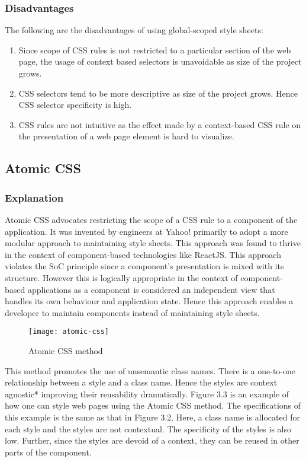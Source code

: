 \documentclass[12pt]{article}
\begin{document}
\subsubsection{Disadvantages}
The following are the disadvantages of using global-scoped style sheets:
\begin{enumerate}
	\item Since scope of CSS rules is not restricted to a particular section of the web page, the usage of context based selectors is unavoidable as size of the project grows.

	\item CSS selectors tend to be more descriptive as size of the project grows. Hence CSS selector specificity is high.

	\item CSS rules are not intuitive as the effect made by a context-based CSS rule on the presentation of a web page element is hard to visualize.
\end{enumerate}

\subsection{Atomic CSS}
\subsubsection{Explanation}
Atomic CSS advocates restricting the scope of a CSS rule to a component of the application. It was invented by engineers at Yahoo! primarily to adopt a more modular approach to maintaining style sheets. This approach was found to thrive in the context of component-based technologies like ReactJS. This approach violates the SoC principle since a component's presentation is mixed with its structure. However this is logically appropriate in the context of component-based applications as a component is considered an independent view that handles its own behaviour and application state. Hence this approach enables a developer to maintain components instead of maintaining style sheets.

\vspace{0.5cm}

\begin{figure}[h]
\texttt{[image: atomic-css]}
\centering
\caption{Atomic CSS method}
\end{figure}

\vspace{0.5cm}

This method promotes the use of unsemantic class names. There is a one-to-one relationship between a style and a class name. Hence the styles are context agnostic* improving their reusability dramatically. Figure 3.3 is an example of how one can style web pages using the Atomic CSS method. The specifications of this example is the same as that in Figure 3.2. Here, a class name is allocated for each style and the styles are not contextual. The specificity of the styles is also low. Further, since the styles are devoid of a context, they can be reused in other parts of the component.
\end{document}
